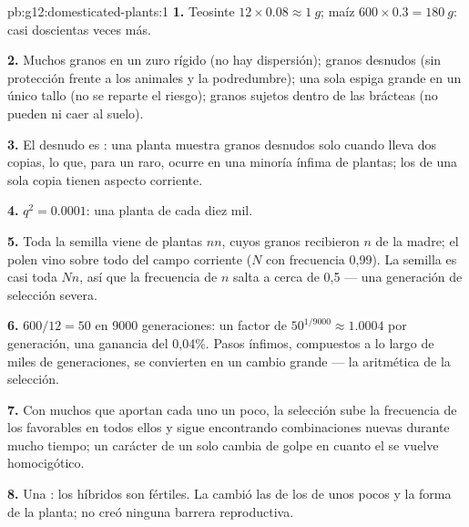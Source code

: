 \begin{solution}{pb:g12:domesticated-plants:1}
\textbf{1.} Teosinte $12 \times 0.08 \approx \qty{1}{g}$; maíz $600
\times 0.3 = \qty{180}{g}$: casi doscientas veces más.

\textbf{2.} Muchos granos en un zuro rígido (no hay dispersión); granos
desnudos (sin protección frente a los animales y la podredumbre); una
sola espiga grande en un único tallo (no se reparte el riesgo); granos
sujetos dentro de las brácteas (no pueden ni caer al suelo).

\textbf{3.} El  desnudo es : una planta muestra granos
desnudos solo cuando lleva dos copias, lo que, para un  raro,
ocurre en una minoría ínfima de plantas; los  de una sola
copia tienen aspecto corriente.

\textbf{4.} $q^2 = 0.0001$: una planta de cada diez mil.

\textbf{5.} Toda la semilla viene de plantas $nn$, cuyos granos
recibieron $n$ de la madre; el polen vino sobre todo del campo
corriente ($N$ con frecuencia 0,99). La semilla es casi toda $Nn$, así
que la frecuencia de $n$ salta a cerca de 0,5 --- una generación de
selección severa.

\textbf{6.} $600/12 = 50$ en 9000 generaciones: un factor de
$50^{1/9000}
\approx 1.0004$ por generación, una ganancia del 0,04\%.
Pasos ínfimos, compuestos a lo largo de miles de generaciones, se
convierten en un cambio grande --- la aritmética de la selección.

\textbf{7.} Con muchos  que aportan cada uno un poco, la selección
sube la frecuencia de los  favorables en todos ellos y sigue
encontrando combinaciones nuevas durante mucho tiempo; un carácter de
un solo  cambia de golpe en cuanto el   se vuelve
homocigótico.

\textbf{8.} Una : los híbridos son fértiles. La 
cambió las  de los  de unos pocos  y la forma de
la planta; no creó ninguna barrera reproductiva.


\end{solution}

